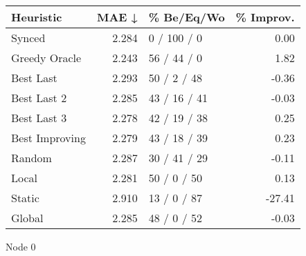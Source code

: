 \begin{tabular}{lrlr}
\toprule
\textbf{Heuristic} & \textbf{MAE ↓} & \textbf{\% Be/Eq/Wo} & \textbf{\% Improv.} \\
\midrule
            Synced &          2.284 &          0 / 100 / 0 &                0.00 \\
     Greedy Oracle &          2.243 &          56 / 44 / 0 &                1.82 \\
         Best Last &          2.293 &          50 / 2 / 48 &               -0.36 \\
       Best Last 2 &          2.285 &         43 / 16 / 41 &               -0.03 \\
       Best Last 3 &          2.278 &         42 / 19 / 38 &                0.25 \\
    Best Improving &          2.279 &         43 / 18 / 39 &                0.23 \\
            Random &          2.287 &         30 / 41 / 29 &               -0.11 \\
             Local &          2.281 &          50 / 0 / 50 &                0.13 \\
            Static &          2.910 &          13 / 0 / 87 &              -27.41 \\
            Global &          2.285 &          48 / 0 / 52 &               -0.03 \\
\bottomrule
\end{tabular}
\caption{Node 0}
\label{tab:hr_iid_lr01_le2_bs4_0}
